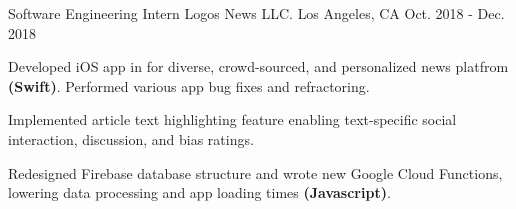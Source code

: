 \begin{cventries}
  \cventry
    {Software Engineering Intern} %
    {Logos News LLC.} %
    {Los Angeles, CA} %
    {Oct. 2018 - Dec. 2018} %
    {
      \begin{cvitems} %
        \item {Developed iOS app in for diverse, crowd-sourced, and personalized news platfrom \textbf{(Swift)}. Performed various app bug fixes and refractoring.
        \item Implemented article text highlighting feature enabling text-specific social interaction, discussion, and bias ratings.}
        \item Redesigned Firebase database structure and wrote new Google Cloud Functions, lowering data processing and app loading times \textbf{(Javascript)}.
      \end{cvitems}
    }

\end{cventries}
